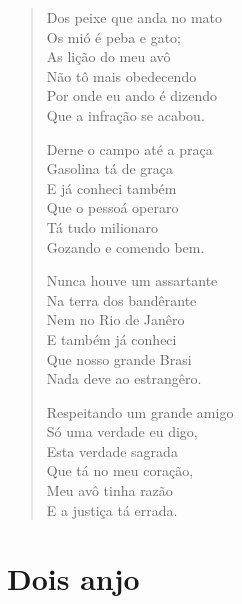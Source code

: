 \begin{verse}
Dos peixe que anda no mato\\
Os mió é peba e gato;\\
As lição do meu avô\\
Não tô mais obedecendo\\
Por onde eu ando é dizendo\\
Que a infração se acabou.

Derne o campo até a praça\\
Gasolina tá de graça\\
E já conheci também\\
Que o pessoá operaro\\
Tá tudo milionaro\\
Gozando e comendo bem.

Nunca houve um assartante\\
Na terra dos bandêrante\\
Nem no Rio de Janêro\\
E também já conheci\\
Que nosso grande Brasi\\
Nada deve ao estrangêro.

Respeitando um grande amigo\\
Só uma verdade eu digo,\\
Esta verdade sagrada\\
Que tá no meu coração,\\
Meu avô tinha razão\\
E a justiça tá errada.
\end{verse}

\chapter{Dois anjo}

